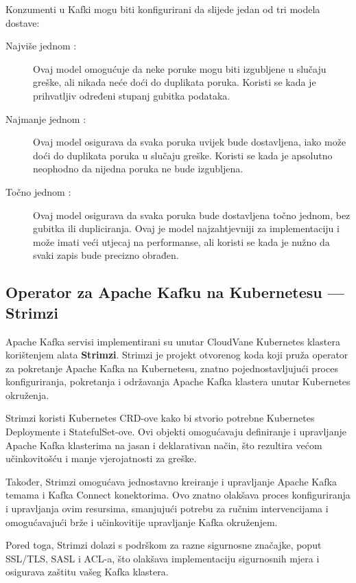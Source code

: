 \documentclass[times, utf8, diplomski]{fer}
\begin{document}
Konzumenti u Kafki mogu biti konfigurirani da slijede jedan od tri modela dostave:

\begin{description}
	\item[Najviše jednom  :] Ovaj model omogućuje da neke poruke mogu biti izgubljene u slučaju greške, ali nikada neće doći do duplikata poruka. Koristi se kada je prihvatljiv određeni stupanj gubitka podataka.
	\item[Najmanje jednom  :] Ovaj model osigurava da svaka poruka uvijek bude dostavljena, iako može doći do duplikata poruka u slučaju greške. Koristi se kada je apsolutno neophodno da nijedna poruka ne bude izgubljena.
	\item[Točno jednom  :] Ovaj model osigurava da svaka poruka bude dostavljena točno jednom, bez gubitka ili dupliciranja. Ovaj je model najzahtjevniji za implementaciju i može imati veći utjecaj na performanse, ali koristi se kada je nužno da svaki zapis bude precizno obrađen.
\end{description}
	
	
\subsection{Operator za Apache Kafku na Kubernetesu --- Strimzi}
\label{sec:strimzi}

Apache Kafka servisi implementirani su unutar CloudVane Kubernetes klastera korištenjem alata \textbf{Strimzi}. Strimzi je projekt otvorenog koda koji pruža operator za pokretanje Apache Kafka na Kubernetesu, znatno pojednostavljujući proces konfiguriranja, pokretanja i održavanja Apache Kafka klastera unutar Kubernetes okruženja.

Strimzi koristi Kubernetes CRD-ove kako bi stvorio potrebne Kubernetes Deploymente i StatefulSet-ove. Ovi objekti omogućavaju definiranje i upravljanje Apache Kafka klasterima na jasan i deklarativan način, što rezultira većom učinkovitošću i manje vjerojatnosti za greške.

Također, Strimzi omogućava jednostavno kreiranje i upravljanje Apache Kafka temama i Kafka Connect konektorima. Ovo znatno olakšava proces konfiguriranja i upravljanja ovim resursima, smanjujući potrebu za ručnim intervencijama i omogućavajući brže i učinkovitije upravljanje Kafka okruženjem.

Pored toga, Strimzi dolazi s podrškom za razne sigurnosne značajke, poput SSL/TLS, SASL i ACL-a, što olakšava implementaciju sigurnosnih mjera i osigurava zaštitu vašeg Kafka klastera.\\
\end{document}
